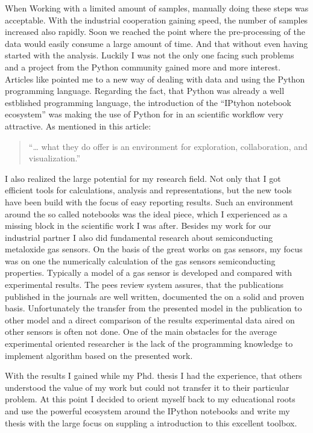 \documentclass[11pt]{article}
\begin{document}
When Working with a limited amount of samples, manually doing these
steps was acceptable. With the industrial cooperation gaining speed, the
number of samples increased also rapidly. Soon we reached the point
where the pre-processing of the data would easily consume a large amount
of time. And that without even having started with the analysis. Luckily
I was not the only one facing such problems and a project from the
Python community gained more and more interest. Articles like
\cite{Unpingco2014} pointed me to a new way of dealing with data and
using the Python programming language. Regarding the fact, that Python
was already a well estblished programming language, the introduction of
the ``IPtyhon notebook ecosystem'' was making the use of Python for in
an scientific workflow very attractive. As mentioned in this article:
\cite{Osipov2016}

\begin{quote}
``\ldots{} what they do offer is an environment for exploration,
collaboration, and visualization.''
\end{quote}

I also realized the large potential for my research field. Not only that
I got efficient tools for calculations, analysis and representations,
but the new tools have been build with the focus of easy reporting
results. Such an environment around the so called notebooks was the
ideal piece, which I experienced as a missing block in the scientific
work I was after. Besides my work for our industrial partner I also did
fundamental research about semiconducting metaloxide gas sensors. On the
basis of the great works on gas sensors, my focus was on one the
numerically calculation of the gas sensors semiconducting properties.
Typically a model of a gas sensor is developed and compared with
experimental results. The pees review system assures, that the
publications published in the journals are well written, documented the
on a solid and proven basis. Unfortunately the transfer from the
presented model in the publication to other model and a direct
comparison of the results experimental data aired on other sensors is
often not done. One of the main obstacles for the average experimental
oriented researcher is the lack of the programming knowledge to
implement algorithm based on the presented work.

With the results I gained while my Phd. thesis I had the experience,
that others understood the value of my work but could not transfer it to
their particular problem. At this point I decided to orient myself back
to my educational roots and use the powerful ecosystem around the
IPython notebooks and write my thesis with the large focus on suppling a
introduction to this excellent toolbox.
\end{document}
